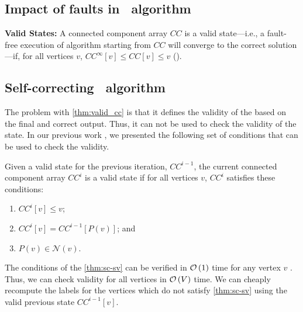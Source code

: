 




\subsection{Impact of faults in \sv~algorithm}

\begin{thm}{ \textbf{Valid States:}}
\label{thm:valid_cc}
A connected component array $CC$ is a valid state---i.e., a fault-free
execution of algorithm starting from $CC$ will converge to
the correct solution---if, for all vertices $v$, $CC^{\infty}[v]\leq CC[v]\leq v$ (\cite{sao2016sccc}).
\end{thm}



\subsection{Self-correcting \sv~algorithm}

The problem with \cref{thm:valid_cc} is that it defines the validity of the
based on the final and correct output. Thus, it can not be used to check the
validity of the state.  In our previous work \cite{sao2016sccc}, we presented
the following set of conditions that can be used to check the validity.

\begin{thm}
\label{thm:sc-sv}
Given a valid state for the previous iteration, $CC^{i-1}$, the current connected component array $CC^{i}$ is a valid state if for all vertices $v$, $CC^{i}$ satisfies these conditions:
\begin{enumerate}
\item $CC^{i}[v] \leq v$; 
\item $CC^{i}[v] = CC^{i-1}[P(v)]$; and
\item $P(v) \in \mathcal{N}(v)$. %
\end{enumerate}
\end{thm}


The conditions of  the \cref{thm:sc-sv} can be verified in $\mathcal{O} \left ( 1 \right )$ time for
any vertex $v$ \cite{sao2016sccc}. Thus,   we can check validity for all
vertices in  $\mathcal{O} \left ( V \right )$ time. We can cheaply recompute the labels for the
vertices  which do not satisfy \cref{thm:sc-sv} using the valid previous state
$CC^{i-1}[v]$.


